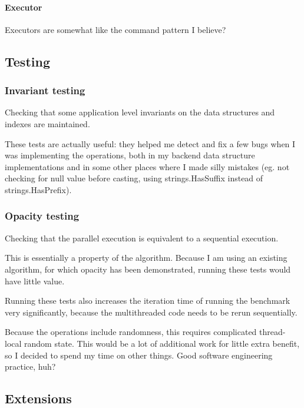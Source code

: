 \documentclass[12pt,a4paper,oneside,openright]{report}
\begin{document}
\paragraph{Executor}

Executors are somewhat like the command pattern I believe?

\subsection{Testing}
\label{sec:impl:testing}

\subsubsection{Invariant testing}
\label{sec:impl:invariant-testing}

Checking that some application level invariants on the data structures
and indexes are maintained.

These tests are actually useful: they helped me detect and fix a few
bugs when I was implementing the operations, both in my backend data
structure implementations and in some other places where I made silly
mistakes (eg. not checking for null value before casting, using
strings.HasSuffix instead of strings.HasPrefix).

\subsubsection{Opacity testing}
\label{sec:impl:opacity-testing}

Checking that the parallel execution is equivalent to a sequential
execution.

This is essentially a property of the algorithm. Because I am using an
existing algorithm, for which opacity has been demonstrated, running
these tests would have little value.

Running these tests also increases the iteration time of running the
benchmark very significantly, because the multithreaded code needs to
be rerun sequentially.

Because the operations include randomness, this requires complicated
thread-local random state. This would be a lot of additional work for
little extra benefit, so I decided to spend my time on other
things. Good software engineering practice, huh?

\subsection{Extensions}
\label{sec:impl:possible-extensions}
\end{document}
